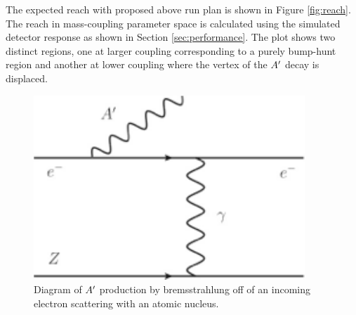 The expected reach with proposed above run plan is shown in Figure \ref{fig:reach}. The reach in mass-coupling parameter space is calculated using the simulated detector response as shown in Section \ref{sec:performance}.  The plot shows two distinct regions,  one at larger coupling corresponding to a purely bump-hunt region and another at lower coupling where the vertex of the $A^\prime$ decay is displaced.  


\begin{figure}
\includegraphics[scale=1]{measurements/Aprime-diagram.pdf}
\caption{Diagram of  $A^\prime$ production by bremsstrahlung off of an incoming electron scattering with an atomic nucleus.}
\label{fig:apdiagram}
\end{figure}

